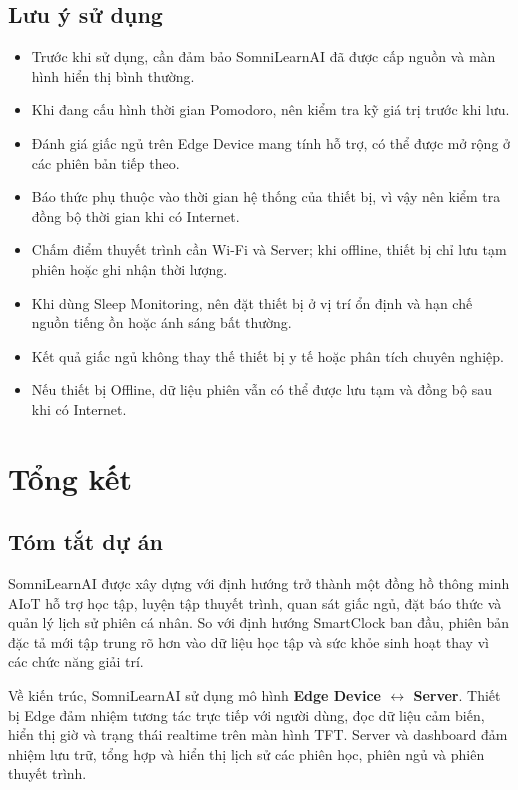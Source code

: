 \documentclass[12pt,a4paper]{article}
\begin{document}
\subsection{Lưu ý sử dụng}

\begin{itemize}
    \item Trước khi sử dụng, cần đảm bảo SomniLearnAI đã được cấp nguồn và màn hình hiển thị bình thường.
    \item Khi đang cấu hình thời gian Pomodoro, nên kiểm tra kỹ giá trị trước khi lưu.
    \item Đánh giá giấc ngủ trên Edge Device mang tính hỗ trợ, có thể được mở rộng ở các phiên bản tiếp theo.
    \item Báo thức phụ thuộc vào thời gian hệ thống của thiết bị, vì vậy nên kiểm tra đồng bộ thời gian khi có Internet.
    \item Chấm điểm thuyết trình cần Wi-Fi và Server; khi offline, thiết bị chỉ lưu tạm phiên hoặc ghi nhận thời lượng.
    \item Khi dùng Sleep Monitoring, nên đặt thiết bị ở vị trí ổn định và hạn chế nguồn tiếng ồn hoặc ánh sáng bất thường.
    \item Kết quả giấc ngủ không thay thế thiết bị y tế hoặc phân tích chuyên nghiệp.
    \item Nếu thiết bị Offline, dữ liệu phiên vẫn có thể được lưu tạm và đồng bộ sau khi có Internet.
\end{itemize}

\newpage
\section{Tổng kết}

\subsection{Tóm tắt dự án}

SomniLearnAI được xây dựng với định hướng trở thành một đồng hồ thông minh AIoT hỗ trợ học tập, luyện tập thuyết trình, quan sát giấc ngủ, đặt báo thức và quản lý lịch sử phiên cá nhân. So với định hướng SmartClock ban đầu, phiên bản đặc tả mới tập trung rõ hơn vào dữ liệu học tập và sức khỏe sinh hoạt thay vì các chức năng giải trí.

Về kiến trúc, SomniLearnAI sử dụng mô hình \textbf{Edge Device $\leftrightarrow$ Server}. Thiết bị Edge đảm nhiệm tương tác trực tiếp với người dùng, đọc dữ liệu cảm biến, hiển thị giờ và trạng thái realtime trên màn hình TFT. Server và dashboard đảm nhiệm lưu trữ, tổng hợp và hiển thị lịch sử các phiên học, phiên ngủ và phiên thuyết trình.
\end{document}
